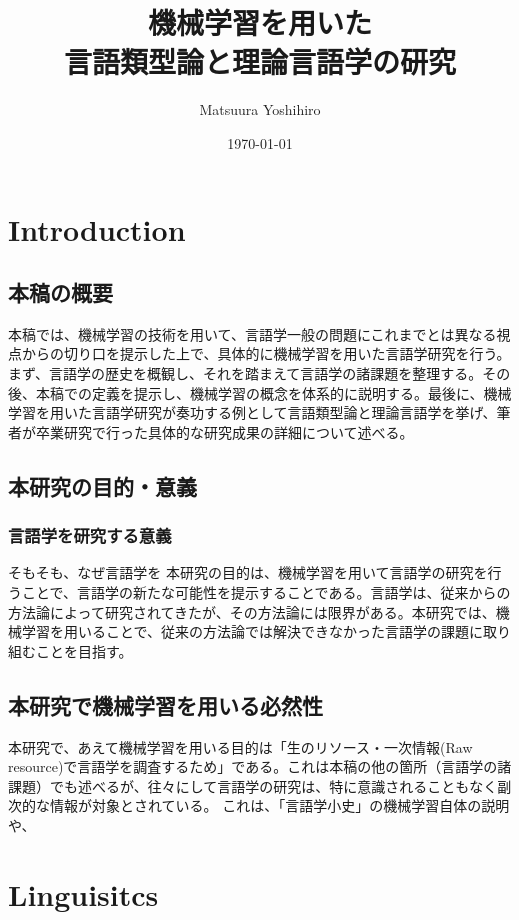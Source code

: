 \documentclass[12pt, oneside]{book}
\title{機械学習を用いた\\言語類型論と理論言語学の研究}
\author{Matsuura Yoshihiro} %
\date{\today} %
\begin{document}
\maketitle

\tableofcontents

\mainmatter
\part{Introduction}
\chapter{本稿の概要}
本稿では、機械学習の技術を用いて、言語学一般の問題にこれまでとは異なる視点からの切り口を提示した上で、具体的に機械学習を用いた言語学研究を行う。
まず、言語学の歴史を概観し、それを踏まえて言語学の諸課題を整理する。その後、本稿での定義を提示し、機械学習の概念を体系的に説明する。最後に、機械学習を用いた言語学研究が奏功する例として言語類型論と理論言語学を挙げ、筆者が卒業研究で行った具体的な研究成果の詳細について述べる。
\chapter{本研究の目的・意義}
\section{言語学を研究する意義}
そもそも、なぜ言語学を
本研究の目的は、機械学習を用いて言語学の研究を行うことで、言語学の新たな可能性を提示することである。言語学は、従来からの方法論によって研究されてきたが、その方法論には限界がある。本研究では、機械学習を用いることで、従来の方法論では解決できなかった言語学の課題に取り組むことを目指す。
\section{}
\chapter{本研究で機械学習を用いる必然性}
本研究で、あえて機械学習を用いる目的は「生のリソース・一次情報(Raw resource)で言語学を調査するため」である。これは本稿の他の箇所（言語学の諸課題）でも述べるが、往々にして言語学の研究は、特に意識されることもなく副次的な情報が対象とされている。
これは、「言語学小史」の機械学習自体の説明や、

\part{Linguisitcs}
\end{document}
